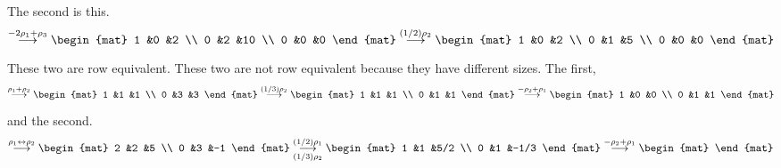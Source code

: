 \begin{exercises}
\begin{answer}
\begin{exparts}
\begin{equation*}
          \end{equation*}
          The second is this.
          \begin{equation*}
            \grstep{-2\rho_1+\rho_3}
            \begin{mat}
              1  &0  &2  \\
              0  &2  &10 \\
              0  &0  &0
            \end{mat}
            \grstep{(1/2)\rho_2}
            \begin{mat}
              1  &0  &2  \\
              0  &1  &5  \\
              0  &0  &0
            \end{mat}
          \end{equation*}
          These two are row equivalent.
        \partsitem These two are not row equivalent because they have different
          sizes.
        \partsitem The first,
          \begin{equation*}
            \grstep{\rho_1+\rho_2}
            \begin{mat}
              1  &1  &1  \\
              0  &3  &3
            \end{mat}
            \grstep{(1/3)\rho_2}
            \begin{mat}
              1  &1  &1  \\
              0  &1  &1
            \end{mat}
            \grstep{-\rho_2+\rho_1}
            \begin{mat}
              1  &0  &0  \\
              0  &1  &1
            \end{mat}
          \end{equation*}
          and the second.
          \begin{equation*}
            \grstep{\rho_1\leftrightarrow\rho_2}
            \begin{mat}
              2  &2  &5  \\
              0  &3  &-1
            \end{mat}
            \grstep[(1/3)\rho_2]{(1/2)\rho_1}
            \begin{mat}
              1  &1  &5/2 \\
              0  &1  &-1/3
            \end{mat}
            \grstep{-\rho_2+\rho_1}
            \begin{mat}

\end{mat}
\end{equation*}
\end{exparts}
\end{answer}
\end{exercises}
